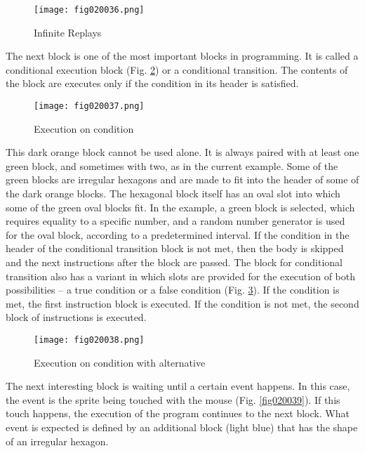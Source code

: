 \begin{figure}[H]
   \centering
   \texttt{[image: fig020036.png]}
   \caption{Infinite Replays}
\label{fig020036}
\end{figure}

The next block is one of the most important blocks in programming. It is called a conditional execution block (Fig. \ref{fig020037}) or a conditional transition. The contents of the block are executes only if the condition in its header is satisfied.

\begin{figure}[H]
   \centering
   \texttt{[image: fig020037.png]}
   \caption{Execution on condition}
\label{fig020037}
\end{figure}

This dark orange block cannot be used alone. It is always paired with at least one green block, and sometimes with two, as in the current example. Some of the green blocks are irregular hexagons and are made to fit into the header of some of the dark orange blocks. The hexagonal block itself has an oval slot into which some of the green oval blocks fit. In the example, a green block is selected, which requires equality to a specific number, and a random number generator is used for the oval block, according to a predetermined interval. If the condition in the header of the conditional transition block is not met, then the body is skipped and the next instructions after the block are passed. The block for conditional transition also has a variant in which slots are provided for the execution of both possibilities – a true condition or a false condition (Fig. \ref{fig020038}). If the condition is met, the first instruction block is executed. If the condition is not met, the second block of instructions is executed.

\begin{figure}[H]
   \centering
   \texttt{[image: fig020038.png]}
   \caption{Execution on condition with alternative}
\label{fig020038}
\end{figure}

The next interesting block is waiting until a certain event happens. In this case, the event is the sprite being touched with the mouse (Fig. \ref{fig020039}). If this touch happens, the execution of the program continues to the next block. What event is expected is defined by an additional block (light blue) that has the shape of an irregular hexagon.

